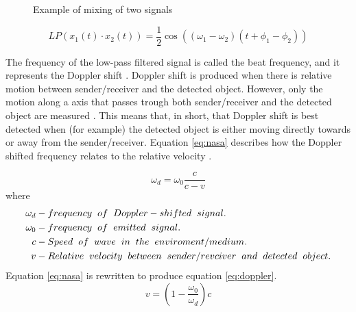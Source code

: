 \begin{figure}[H]
\centering

  \caption{Example of mixing of two signals}
  \label{fig:mix}
\end{figure}
\begin{equation} \label{eq:LP(mix)}
    LP(x_1(t) \cdot x_2(t)) = \frac{1}{2} 
 \cos((\omega_{1} - \omega_{2})(t + \phi_{1}-\phi_{2}))
\end{equation}

The frequency of the low-pass filtered signal is called the beat frequency, and it represents the Doppler shift \cite{douglas2022fmcw}. Doppler shift is produced when there is relative motion between sender/receiver and the detected object. However, only the motion along a axis that passes trough both sender/receiver and the detected object are measured \cite{cwradar}. This means that, in short, that Doppler shift is best detected when (for example) the detected object is either moving directly towards or away from the sender/receiver. Equation \ref{eq:nasa} describes how the Doppler shifted frequency relates to the relative velocity \cite{doppler_effect_nasa}.

\begin{equation} \label{eq:nasa}
    \omega_d = \omega_0 \frac{c}{c - v} 
\end{equation}
where 
\begin{align*} 
\omega_d   & - frequency \hspace{2mm} of \hspace{2mm} Doppler-shifted \hspace{2mm} signal.\\
\omega_0   & - frequency \hspace{2mm} of \hspace{2mm} emitted \hspace{2mm} signal.\\
c   & - Speed \hspace{2mm} of \hspace{2mm} wave \hspace{2mm} in \hspace{2mm} the \hspace{2mm} enviroment/medium.\\
v   & - Relative \hspace{2mm} velocity \hspace{2mm} between \hspace{2mm} sender/revciver \hspace{2mm} and \hspace{2mm} detected \hspace{2mm} object.\\
\end{align*}  
Equation \ref{eq:nasa} is rewritten to produce equation \ref{eq:doppler}.
\begin{equation} \label{eq:doppler}
    v = \left( 1 - \frac{\omega_0}{\omega_d} \right) c
\end{equation}

